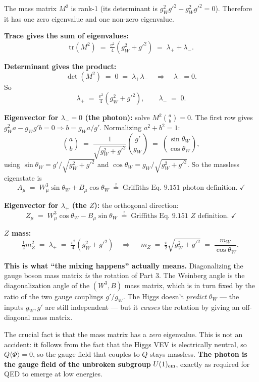 \documentclass[11pt]{article}
\begin{document}
\begin{stepbox}[title=Step 5.4: Find eigenvalues and eigenvectors]
The mass matrix $M^2$ is rank-1 (its determinant is $g_W^2 g'^2 - g_W^2 g'^2 = 0$).
Therefore it has one zero eigenvalue and one non-zero eigenvalue.

\textbf{Trace gives the sum of eigenvalues:}
\[
\text{tr}(M^2) \;=\; \tfrac{v^2}{4}(g_W^2 + g'^2) \;=\; \lambda_+ + \lambda_- .
\]

\textbf{Determinant gives the product:}
\[
\det(M^2) \;=\; 0 \;=\; \lambda_+ \lambda_- \quad\Longrightarrow\quad \lambda_- = 0 .
\]
So
\[
\lambda_+ \;=\; \tfrac{v^2}{4}(g_W^2 + g'^2),
\qquad \lambda_- \;=\; 0 .
\]

\textbf{Eigenvector for $\lambda_- = 0$ (the photon):} solve
$M^2 \binom{a}{b} = 0$. The first row gives $g_W^2 a - g_W g' b = 0 \Rightarrow b = g_W a / g'$.
Normalizing $a^2 + b^2 = 1$:
\[
\binom{a}{b} \;=\; \frac{1}{\sqrt{g_W^2 + g'^2}} \binom{g'}{g_W}
\;=\; \binom{\sin\theta_W}{\cos\theta_W} ,
\]
using $\sin\theta_W = g'/\sqrt{g_W^2 + g'^2}$ and $\cos\theta_W = g_W/\sqrt{g_W^2 + g'^2}$.
So the massless eigenstate is
\[
A_\mu \;=\; W^3_\mu \sin\theta_W + B_\mu \cos\theta_W
\;\stackrel{!}{=}\; \text{Griffiths Eq.~9.151 photon definition.}\;\checkmark
\]

\textbf{Eigenvector for $\lambda_+$ (the $Z$):} the orthogonal direction:
\[
Z_\mu \;=\; W^3_\mu \cos\theta_W - B_\mu \sin\theta_W
\;\stackrel{!}{=}\; \text{Griffiths Eq.~9.151 $Z$ definition.}\;\checkmark
\]

\textbf{$Z$ mass:}
\[
\tfrac{1}{2} m_Z^2 \;=\; \lambda_+ \;=\; \tfrac{v^2}{4}(g_W^2 + g'^2)
\quad\Longrightarrow\quad
\boxed{\;m_Z \;=\; \tfrac{v}{2}\sqrt{g_W^2 + g'^2} \;=\; \frac{m_W}{\cos\theta_W} .\;}
\]
\end{stepbox}

\begin{insightbox}
\textbf{This is what ``the mixing happens'' actually means.} Diagonalizing the gauge boson
mass matrix \emph{is} the rotation of Part 3. The Weinberg angle is the diagonalization
angle of the $(W^3, B)$ mass matrix, which is in turn fixed by the ratio of the two gauge
couplings $g'/g_W$. The Higgs doesn't \emph{predict} $\theta_W$ --- the inputs $g_W, g'$
are still independent --- but it \emph{causes} the rotation by giving an off-diagonal mass
matrix.

The crucial fact is that the mass matrix has a \emph{zero} eigenvalue. This is not an
accident: it follows from the fact that the Higgs VEV is electrically neutral, so
$Q\langle\Phi\rangle = 0$, so the gauge field that couples to $Q$ stays massless. \textbf{The
photon is the gauge field of the unbroken subgroup} $U(1)_{\rm em}$, exactly as required
for QED to emerge at low energies.
\end{insightbox}
\end{document}

